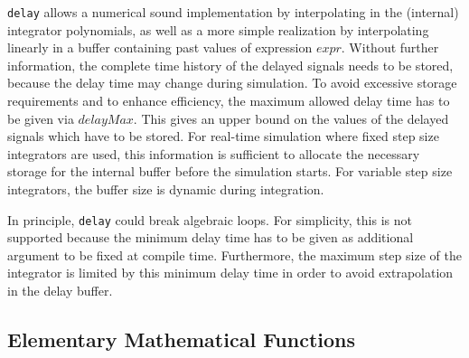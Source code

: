 \begin{nonnormative}
\lstinline!delay! allows a numerical sound implementation by interpolating in the (internal) integrator polynomials, as well as a more simple realization by interpolating linearly in a buffer containing past values of expression $\mathit{expr}$.
Without further information, the complete time history of the delayed signals needs to be stored, because the delay time may change during simulation.
To avoid excessive storage requirements and to enhance efficiency, the maximum allowed delay time has to be given via $\mathit{delayMax}$.
This gives an upper bound on the values of the delayed signals which have to be stored.
For real-time simulation where fixed step size integrators are used, this information is sufficient to allocate the necessary storage for the internal buffer before the simulation starts.
For variable step size integrators, the buffer size is dynamic during integration.

In principle, \lstinline!delay! could break algebraic loops.
For simplicity, this is not supported because the minimum delay time has to be given as additional argument to be fixed at compile time.
Furthermore, the maximum step size of the integrator is limited by this minimum delay time in order to avoid extrapolation in the delay buffer.
\end{nonnormative}


\subsection{Elementary Mathematical Functions}\label{built-in-mathematical-functions-and-external-built-in-functions}

